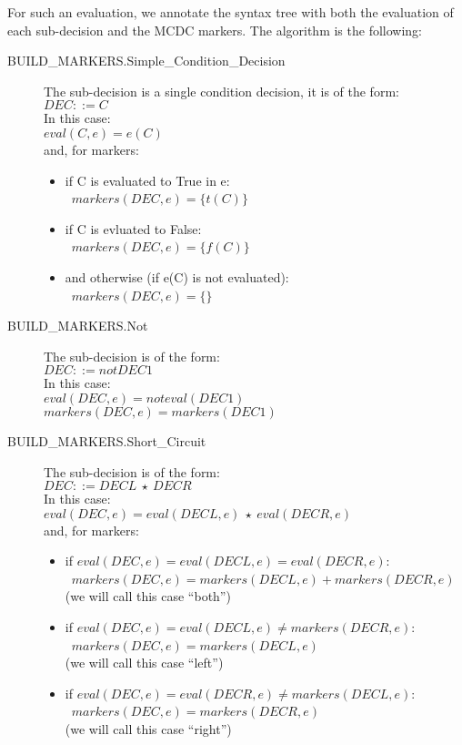\documentclass[a4paper,12pt,twoside]{article}
\newcommand{\anysc}{\star}
\begin{document}
For such an evaluation, we annotate the syntax tree with both the
evaluation of each sub-decision and the MCDC markers. The algorithm
is the following:

\begin{description}
\item[BUILD\_MARKERS.Simple\_Condition\_Decision]
  The sub-decision is a single condition decision, it is of the form:\\
  $DEC ::= C$\\
  In this case:\\
  $eval(C, e) = e(C)$\\
  and, for markers:
  \begin{itemize}
  \item if C is evaluated to True in e:\\
  \ $markers(DEC, e) = \{t(C)\}$
  \item if C is evluated to False:\\
  \ $markers(DEC, e) = \{f(C)\}$
  \item and otherwise (if e(C) is not evaluated):\\
  \ $markers(DEC, e) = \{\}$\\
  \end{itemize}

\item[BUILD\_MARKERS.Not]
 The sub-decision is of the form:\\
 $DEC ::= not DEC1$\\
 In this case:\\
 $eval(DEC, e)  = not eval(DEC1)$\\
 $markers(DEC, e) = markers(DEC1)$\\

\item[BUILD\_MARKERS.Short\_Circuit]
 The sub-decision is of the form:\\
 $DEC ::= DECL \ \anysc{} \ DECR$\\
 In this case:\\
 $eval(DEC, e) = eval(DECL, e) \ \anysc{} \ eval(DECR, e)$\\
 and, for markers:
 \begin{itemize}
 \item if $eval(DEC, e) = eval(DECL, e) = eval(DECR, e)$:\\
 \  $markers(DEC, e) = markers(DECL, e) + markers(DECR, e)$\\
 (we will call this case ``both'')
 \item if $eval(DEC, e) = eval(DECL, e) \ne markers(DECR, e)$:\\
 \  $markers(DEC, e) = markers(DECL, e)$\\
 (we will call this case ``left'')
 \item if $eval(DEC, e) = eval(DECR, e) \ne markers(DECL, e)$:\\
 \  $markers(DEC, e) = markers(DECR, e)$\\
 (we will call this case ``right'')
 \end{itemize}
\end{description}
\end{document}
